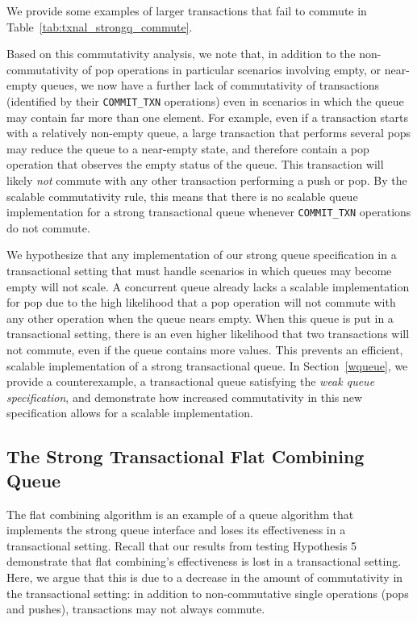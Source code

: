 \noindent We provide some examples of larger transactions that fail to commute in Table~\ref{tab:txnal_strongq_commute}.

Based on this commutativity analysis, we note that, in addition to the non-commutativity of pop operations in particular scenarios involving empty, or near-empty queues, we now have a further lack of commutativity of transactions (identified by their \texttt{COMMIT\_TXN} operations) even in scenarios in which the queue may contain far more than one element. For example, even if a transaction starts with a relatively non-empty queue, a large transaction that performs several pops may reduce the queue to a near-empty state, and therefore contain a pop operation that observes the empty status of the queue. This transaction will likely \emph{not} commute with any other transaction performing a push or pop.  By the scalable commutativity rule, this means that there is no scalable queue implementation for a strong transactional queue whenever \texttt{COMMIT\_TXN} operations do not commute.

We hypothesize that any implementation of our strong queue specification in a transactional setting that must handle scenarios in which queues may become empty will not scale. A concurrent queue already lacks a scalable implementation for pop due to the high likelihood that a pop operation will not commute with any other operation when the queue nears empty. When this queue is put in a transactional setting, there is an even higher likelihood that two transactions will not commute, even if the queue contains more values. This prevents an efficient, scalable implementation of a strong transactional queue. In Section~\ref{wqueue}, we provide a counterexample, a transactional queue satisfying the \emph{weak queue specification}, and demonstrate how increased commutativity in this new specification allows for a scalable implementation.

\subsection{The Strong Transactional Flat Combining Queue}
The flat combining algorithm is an example of a queue algorithm that implements the strong queue interface and loses its effectiveness in a transactional setting. Recall that our results from testing Hypothesis 5 demonstrate that flat combining's effectiveness is lost in a transactional setting. Here, we argue that this is due to a decrease in the amount of commutativity in the transactional setting: in addition to non-commutative single operations (pops and pushes), transactions may not always commute.

